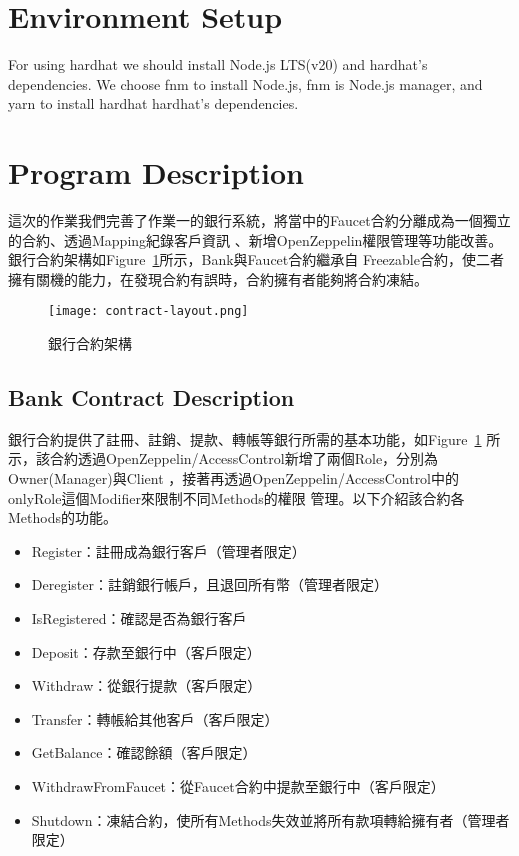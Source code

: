\section{Environment Setup}

For using hardhat we should install Node.js LTS(v20)\cite{nodejs} and hardhat's
dependencies. We choose fnm\cite{fnm} to install Node.js, fnm is Node.js manager, and
yarn\cite{yarn} to install hardhat hardhat's dependencies.

\section{Program Description}

這次的作業我們完善了作業一的銀行系統，將當中的Faucet合約分離成為一個獨立的合約、透過Mapping紀錄客戶資訊
、新增OpenZeppelin權限管理等功能改善。銀行合約架構如Figure~\ref{fig:clayout}所示，Bank與Faucet合約繼承自
Freezable合約，使二者擁有關機的能力，在發現合約有誤時，合約擁有者能夠將合約凍結。

\begin{figure}[H]
    \centering
    \texttt{[image: contract-layout.png]}
    \caption{銀行合約架構}
    \label{fig:clayout}
\end{figure}

\subsection{Bank Contract Description}

銀行合約提供了註冊、註銷、提款、轉帳等銀行所需的基本功能，如Figure~\ref{fig:clayout}
所示，該合約透過OpenZeppelin/AccessControl新增了兩個Role，分別為Owner(Manager)與Client
，接著再透過OpenZeppelin/AccessControl中的onlyRole這個Modifier來限制不同Methods的權限
管理。以下介紹該合約各Methods的功能。

\begin{itemize}
  \item Register：註冊成為銀行客戶（管理者限定）
  \item Deregister：註銷銀行帳戶，且退回所有幣（管理者限定）
  \item IsRegistered：確認是否為銀行客戶
  \item Deposit：存款至銀行中（客戶限定）
  \item Withdraw：從銀行提款（客戶限定）
  \item Transfer：轉帳給其他客戶（客戶限定）
  \item GetBalance：確認餘額（客戶限定）
  \item WithdrawFromFaucet：從Faucet合約中提款至銀行中（客戶限定）
  \item Shutdown：凍結合約，使所有Methods失效並將所有款項轉給擁有者（管理者限定）
\end{itemize}

